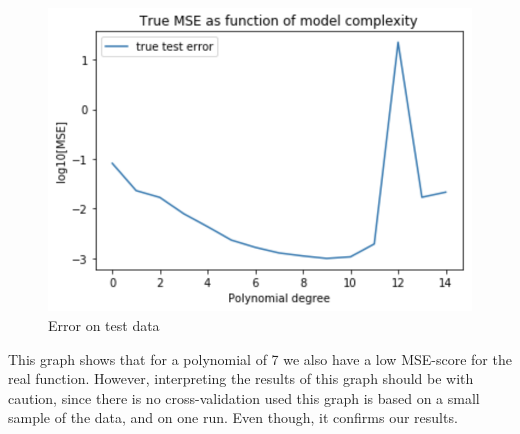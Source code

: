 \documentclass[12pt]{extarticle}
\begin{document}
\begin{figure}
    \centering
    \includegraphics[width=0.9\linewidth]{14}
    \caption{Error on test data}
    \label{fig:f12}
\end{figure}

This graph shows that for a polynomial of 7 we also have a low MSE-score for the real function. However, interpreting the results of this graph should be with caution, since there is no cross-validation used this graph is based on a small sample of the data, and on one run. Even though, it confirms our results. 

\clearpage



\end{document}
